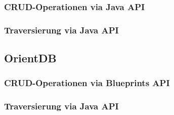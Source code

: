 \subsubsection{CRUD-Operationen via Java API}

\subsubsection{Traversierung via Java API}

\subsection{OrientDB}

\subsubsection{CRUD-Operationen via Blueprints API}
\label{anh:orientdb_blueprints_api}

\subsubsection{Traversierung via Java API}
\label{anh:orientdb_traverse_java}

